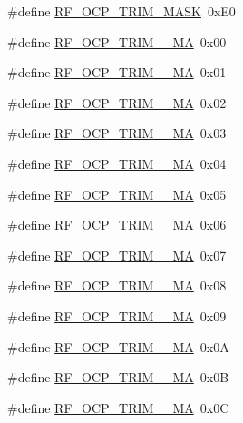 \begin{DoxyCompactItemize}
\item 
\#define \mbox{\hyperlink{sx1276_regs-_fsk_8h_a01f3bea912fa624b72dc713e92fd4b05}{R\+F\+\_\+\+O\+C\+P\+\_\+\+T\+R\+I\+M\+\_\+\+M\+A\+SK}}~0x\+E0
\item 
\#define \mbox{\hyperlink{sx1276_regs-_fsk_8h_a100553bbc898d5cfcaf0c5f0ee8e1ac1}{R\+F\+\_\+\+O\+C\+P\+\_\+\+T\+R\+I\+M\+\_\+\_\+\+MA}}~0x00
\item 
\#define \mbox{\hyperlink{sx1276_regs-_fsk_8h_ae63185fb50f27713e94bc100dff0f991}{R\+F\+\_\+\+O\+C\+P\+\_\+\+T\+R\+I\+M\+\_\+\_\+\+MA}}~0x01
\item 
\#define \mbox{\hyperlink{sx1276_regs-_fsk_8h_ae614e18d5387cbdda89f9a375f76eac6}{R\+F\+\_\+\+O\+C\+P\+\_\+\+T\+R\+I\+M\+\_\+\_\+\+MA}}~0x02
\item 
\#define \mbox{\hyperlink{sx1276_regs-_fsk_8h_a7ba90fa227a1b2b43ae699d0e89b1ed5}{R\+F\+\_\+\+O\+C\+P\+\_\+\+T\+R\+I\+M\+\_\+\_\+\+MA}}~0x03
\item 
\#define \mbox{\hyperlink{sx1276_regs-_fsk_8h_a71a92d9741db30ff30e3f262438ae62f}{R\+F\+\_\+\+O\+C\+P\+\_\+\+T\+R\+I\+M\+\_\+\_\+\+MA}}~0x04
\item 
\#define \mbox{\hyperlink{sx1276_regs-_fsk_8h_aa66596103d632808f6927635cb4049f1}{R\+F\+\_\+\+O\+C\+P\+\_\+\+T\+R\+I\+M\+\_\+\_\+\+MA}}~0x05
\item 
\#define \mbox{\hyperlink{sx1276_regs-_fsk_8h_a9fc05aaa1ed0f566c01aff24164080aa}{R\+F\+\_\+\+O\+C\+P\+\_\+\+T\+R\+I\+M\+\_\+\_\+\+MA}}~0x06
\item 
\#define \mbox{\hyperlink{sx1276_regs-_fsk_8h_ad91d8ca7ffc7866cec37af6b3cefeb91}{R\+F\+\_\+\+O\+C\+P\+\_\+\+T\+R\+I\+M\+\_\+\_\+\+MA}}~0x07
\item 
\#define \mbox{\hyperlink{sx1276_regs-_fsk_8h_a457a3f7221afb38da84a69a8745e53b6}{R\+F\+\_\+\+O\+C\+P\+\_\+\+T\+R\+I\+M\+\_\+\_\+\+MA}}~0x08
\item 
\#define \mbox{\hyperlink{sx1276_regs-_fsk_8h_aae9790e06b8eb78619b36ddac797362d}{R\+F\+\_\+\+O\+C\+P\+\_\+\+T\+R\+I\+M\+\_\+\_\+\+MA}}~0x09
\item 
\#define \mbox{\hyperlink{sx1276_regs-_fsk_8h_a26174898b5ac7efce60f4b347910b1ca}{R\+F\+\_\+\+O\+C\+P\+\_\+\+T\+R\+I\+M\+\_\+\_\+\+MA}}~0x0A
\item 
\#define \mbox{\hyperlink{sx1276_regs-_fsk_8h_a1387ca1b80a4984a2de36325743a6050}{R\+F\+\_\+\+O\+C\+P\+\_\+\+T\+R\+I\+M\+\_\+\_\+\+MA}}~0x0B
\item 
\#define \mbox{\hyperlink{sx1276_regs-_fsk_8h_a87c78055bb1ff7e9f72416324d1afa5f}{R\+F\+\_\+\+O\+C\+P\+\_\+\+T\+R\+I\+M\+\_\+\_\+\+MA}}~0x0C

\end{DoxyCompactItemize}
